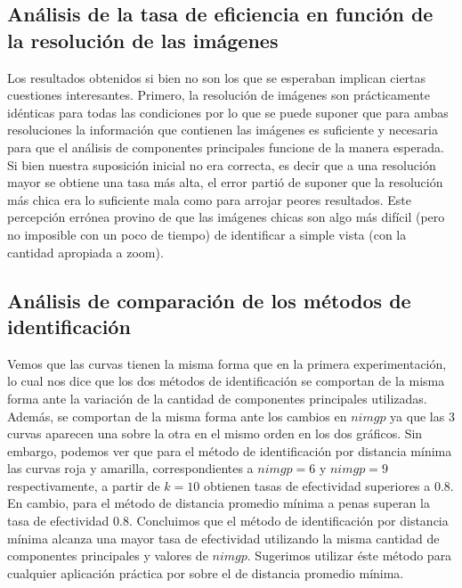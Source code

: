 \subsection{Análisis de la tasa de eficiencia en función de la resolución de las imágenes}
Los resultados obtenidos si bien no son los que se esperaban implican ciertas cuestiones interesantes. Primero, la resolución de imágenes son prácticamente idénticas para todas las condiciones por lo que se puede suponer que para ambas resoluciones la información que contienen las imágenes es suficiente y necesaria para que el análisis de componentes principales funcione de la manera esperada. Si bien nuestra suposición inicial no era correcta, es decir que a una resolución mayor se obtiene una tasa más alta, el error partió de suponer que la resolución más chica era lo suficiente mala como para arrojar peores resultados. Este percepción errónea provino de que las imágenes chicas son algo más difícil (pero no imposible con un poco de tiempo) de identificar a simple vista (con la cantidad apropiada a zoom).

\subsection{Análisis de comparación de los métodos de identificación}
Vemos que las curvas tienen la misma forma que en la primera experimentación, lo cual nos dice que los dos métodos de identificación
se comportan de la misma forma ante la variación de la cantidad de componentes principales utilizadas. Además, se comportan de la misma
forma ante los cambios en $nimgp$ ya que las 3 curvas aparecen una sobre la otra en el mismo orden en los dos gráficos. Sin embargo, 
podemos ver que para el método de identificación por distancia mínima las curvas roja y amarilla, correspondientes a $nimgp = 6$ y $nimgp = 9$
respectivamente, a partir de $k = 10$ obtienen tasas de efectividad superiores a $0.8$. En cambio, para el método de distancia promedio mínima
a penas superan la tasa de efectividad $0.8$. Concluimos que el método de identificación por distancia mínima alcanza una mayor tasa de 
efectividad utilizando la misma cantidad de componentes principales y valores de $nimgp$. Sugerimos utilizar éste método para cualquier
aplicación práctica por sobre el de distancia promedio mínima.

